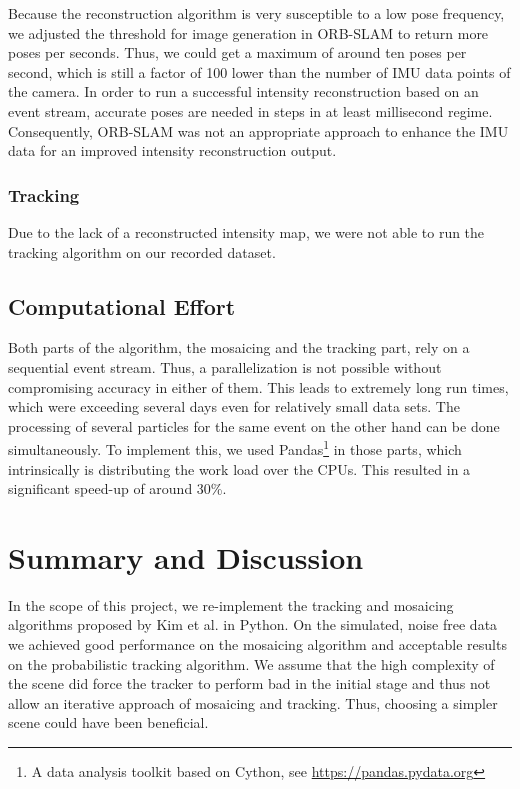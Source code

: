 \documentclass[10pt,twocolumn,letterpaper]{article}
\begin{document}
Because the reconstruction algorithm is very susceptible to a low pose frequency, we adjusted the threshold for image generation in ORB-SLAM to return more poses per seconds. Thus, we could get a maximum of around ten poses per second, which is still a factor of 100 lower than the number of IMU data points of the camera. In order to run a successful intensity reconstruction based on an event stream, accurate poses are needed in steps in at least millisecond regime. Consequently, ORB-SLAM was not an appropriate approach to enhance the IMU data for an improved intensity reconstruction output. 

\subsubsection{Tracking}
Due to the lack of a reconstructed intensity map, we were not able to run the tracking algorithm on our recorded dataset. 

\subsection{Computational Effort}
Both parts of the algorithm, the mosaicing and the tracking part, rely on a sequential event stream. Thus, a parallelization is not possible without compromising accuracy in either of them. This leads to extremely long run times, which were exceeding several days even for relatively small data sets. The processing of several particles for the same event on the other hand can be done simultaneously. To implement this, we used Pandas\footnote{A data analysis toolkit based on Cython, see \url{https://pandas.pydata.org}} in those parts, which intrinsically is distributing the work load over the CPUs. This resulted in a significant speed-up of around 30\%. 


\section{Summary and Discussion}
In the scope of this project, we re-implement the tracking and mosaicing algorithms proposed by Kim et al. \cite{kim2014simultaneous} in Python. On the simulated, noise free data we achieved good performance on the mosaicing algorithm and acceptable results on the probabilistic tracking algorithm. We assume that the high complexity of the scene did force the tracker to perform bad in the initial stage and thus not allow an iterative approach of mosaicing and tracking. Thus, choosing a simpler scene could have been beneficial. 
\end{document}
